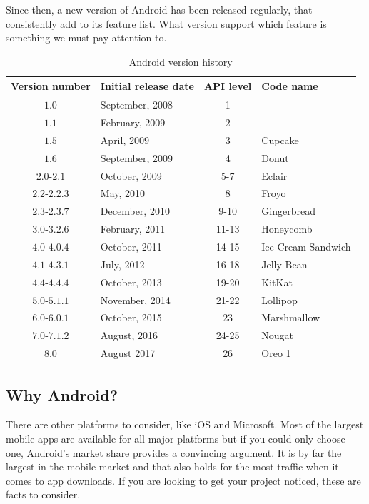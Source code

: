 Since then, a new version of Android has been released regularly, that consistently add to its feature list. What version support which feature is something we must pay attention to.

\begin{table}[H]
\centering
\begin{tabular}{c|l|c|l}
Version number & Initial release date & API level & Code name \\
\hline
$1.0$ & September, 2008 & 1 & \\
$1.1$ & February, 2009 & 2 & \\
$1.5$ & April, 2009 & 3 & Cupcake \\
$1.6$ & September, 2009 & 4 & Donut \\
$2.0$-$2.1$ & October, 2009 & 5-7 & Eclair \\
$2.2$-$2.2.3$ & May, 2010 & 8 & Froyo \\
$2.3$-$2.3.7$ & December, 2010 & 9-10 & Gingerbread \\
$3.0$-$3.2.6$ & February, 2011 & 11-13 & Honeycomb \\
$4.0$-$4.0.4$ & October, 2011 & 14-15 & Ice Cream Sandwich \\
$4.1$-$4.3.1$ & July, 2012 & 16-18 & Jelly Bean \\
$4.4$-$4.4.4$ & October, 2013 & 19-20 & KitKat \\
$5.0$-$5.1.1$ & November, 2014 & 21-22 & Lollipop \\
$6.0$-$6.0.1$ & October, 2015 & 23 & Marshmallow \\
$7.0$-$7.1.2$ & August, 2016 & 24-25 & Nougat \\
$8.0$ & August 2017 & 26 & Oreo 1\\
\end{tabular}
\caption{Android version history}
\label{table:droidvers}
\end{table}

\subsection{Why Android?}
There are other platforms to consider, like iOS and Microsoft. Most of the largest mobile apps are available for all major platforms but if you could only choose one, Android's market share provides a convincing argument. It is by far the largest in the mobile market and that also holds for the most traffic when it comes to app downloads. If you are looking to get your project noticed, these are facts to consider.\\

